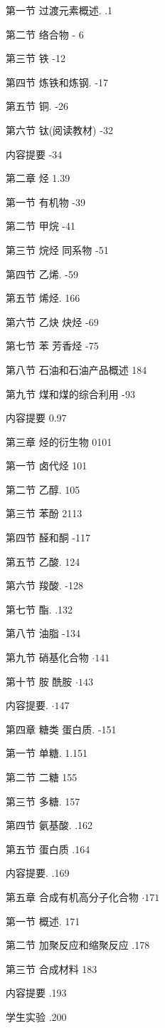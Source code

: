 \documentclass[10pt]{article}
\begin{document}
第一节 过渡元素概述. .1

第二节 络合物 - 6

第三节 铁 -12

第四节 炼铁和炼钢. -17

第五节 铜. -26

第六节 钛(阅读教材) -32

内容提要 -34

第二章 烃 1.39

第一节 有机物 -39

第二节 甲烷 -41

第三节 烷烃 同系物 -51

第四节 乙烯. -59

第五节 烯烃. 166

第六节 乙炔 炔烃 -69

第七节 苯 芳香烃 -75

第八节 石油和石油产品概述 184

第九节 煤和煤的综合利用 -93

内容提要 0.97

第三章 烃的衍生物 0101

第一节 卤代烃 101

第二节 乙醇. 105

第三节 苯酚 2113

第四节 醛和酮 -117

第五节 乙酸. 124

第六节 羧酸. -128

第七节 酯. .132

第八节 油脂 -134

第九节 硝基化合物 \(\cdot {141}\)

第十节 胺 酰胺 \(\cdot {143}\)

内容提要. \(\cdot {147}\)

第四章 糖类 蛋白质. -151

第一节 单糖. 1.151

第二节 二糖 155

第三节 多糖. 157

第四节 氨基酸. .162

第五节 蛋白质 .164

内容提要. .169

第五章 合成有机高分子化合物 \(\cdot {171}\)

第一节 概述. 171

第二节 加聚反应和缩聚反应 .178

第三节 合成材料 183

内容提要 .193

学生实验 .200
\end{document}
